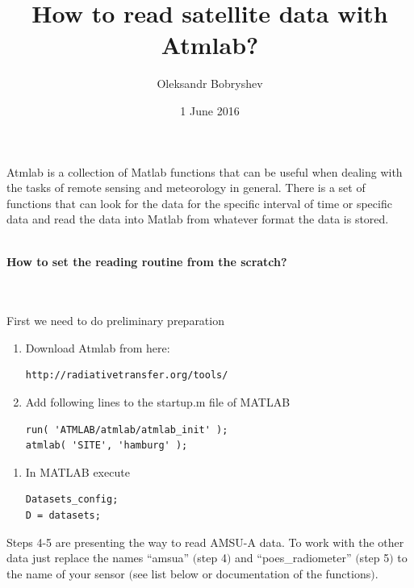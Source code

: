 \documentclass[12pt,a4paper]{article}
\title{How to read satellite data with Atmlab?}
\author{Oleksandr Bobryshev}
\date{1 June 2016}
\begin{document}
\maketitle

Atmlab is a collection of Matlab functions that can be useful when dealing with the tasks of remote sensing and meteorology in general.
There is a set of functions that can look for the data for the specific interval of time or specific data and read the data into Matlab from whatever format the data is stored.
\\
\\
\begin{large}\textbf{How to set the reading routine from the scratch? }
\end{large}
\\
\\
First we need to do preliminary preparation
\begin{enumerate}
  \item	Download Atmlab from here:

\begin{lstlisting}
http://radiativetransfer.org/tools/
\end{lstlisting}

  \item	Add following lines to the startup.m file of MATLAB
\begin{lstlisting}
run( 'ATMLAB/atmlab/atmlab_init' );
atmlab( 'SITE', 'hamburg' );
\end{lstlisting}
\end{enumerate}


\begin{enumerate}[resume]
  \item	In MATLAB execute
\begin{lstlisting}
Datasets_config; 
D = datasets;
\end{lstlisting}
\end{enumerate}


Steps 4-5 are presenting the way to read AMSU-A data. To work with the other data just replace the names ``amsua'' $($step 4$)$ and ``poes\_radiometer'' $($step 5$)$ to the name of your sensor $($see list below or documentation of the functions$)$.
\end{document}
